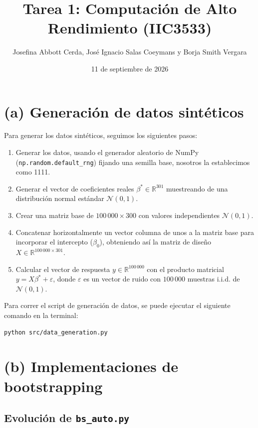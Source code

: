 \documentclass[12pt, letterpaper]{article}
\title{Tarea 1: Computación de Alto Rendimiento (IIC3533)}
\author{Josefina Abbott Cerda, José Ignacio Salas Coeymans y Borja Smith Vergara}
\date{11 de septiembre de 2026}
\begin{document}
\maketitle

\section*{(a) Generación de datos sintéticos}
Para generar los datos sintéticos, seguimos los siguientes pasos:

\begin{enumerate}
    \item Generar los datos, usando el generador aleatorio de NumPy (\texttt{np.random.default\_rng}) fijando una semilla base, nosotros la establecimos como 1111.
    \item Generar el vector de coeficientes reales $\beta^* \in \mathbb{R}^{301}$ muestreando de una distribución normal estándar $\mathcal{N}(0,1)$. 
    \item Crear una matriz base de $100\,000 \times 300$ con valores independientes $\mathcal{N}(0,1)$.
    \item Concatenar horizontalmente un vector columna de unos a la matriz base para incorporar el intercepto ($\beta_0$), obteniendo así la matriz de diseño $X \in \mathbb{R}^{100\,000 \times 301}$.
    \item Calcular el vector de respuesta $y \in \mathbb{R}^{100\,000}$ con el producto matricial $y = X\beta^* + \varepsilon$, donde $\varepsilon$ es un vector de ruido con $100\,000$ muestras i.i.d. de $\mathcal{N}(0,1)$.
\end{enumerate}

Para correr el script de generación de datos, se puede ejecutar el siguiente comando en la terminal:
\begin{verbatim}
python src/data_generation.py
\end{verbatim}

\section*{(b) Implementaciones de bootstrapping}

\subsection*{Evolución de \texttt{bs\_auto.py}}
\end{document}
